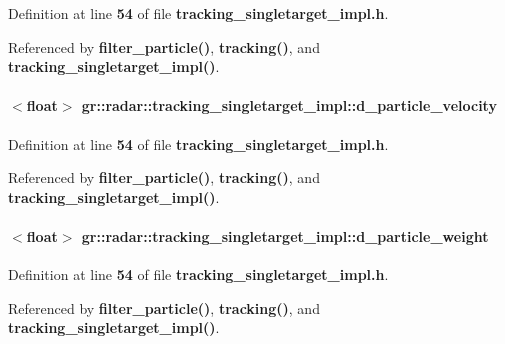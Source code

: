 Definition at line {\bf 54} of file {\bf tracking\+\_\+singletarget\+\_\+impl.\+h}.



Referenced by {\bf filter\+\_\+particle()}, {\bf tracking()}, and {\bf tracking\+\_\+singletarget\+\_\+impl()}.

\paragraph[{d\+\_\+particle\+\_\+velocity}]{$<$float$>$ gr\+::radar\+::tracking\+\_\+singletarget\+\_\+impl\+::d\+\_\+particle\+\_\+velocity}\label{classgr_1_1radar_1_1tracking__singletarget__impl_a19032b3e8b54baa6502ecace3eea2cb0}


Definition at line {\bf 54} of file {\bf tracking\+\_\+singletarget\+\_\+impl.\+h}.



Referenced by {\bf filter\+\_\+particle()}, {\bf tracking()}, and {\bf tracking\+\_\+singletarget\+\_\+impl()}.

\paragraph[{d\+\_\+particle\+\_\+weight}]{$<$float$>$ gr\+::radar\+::tracking\+\_\+singletarget\+\_\+impl\+::d\+\_\+particle\+\_\+weight}\label{classgr_1_1radar_1_1tracking__singletarget__impl_ad9d006cc5421773cf4187fc89490d0b7}


Definition at line {\bf 54} of file {\bf tracking\+\_\+singletarget\+\_\+impl.\+h}.



Referenced by {\bf filter\+\_\+particle()}, {\bf tracking()}, and {\bf tracking\+\_\+singletarget\+\_\+impl()}.

